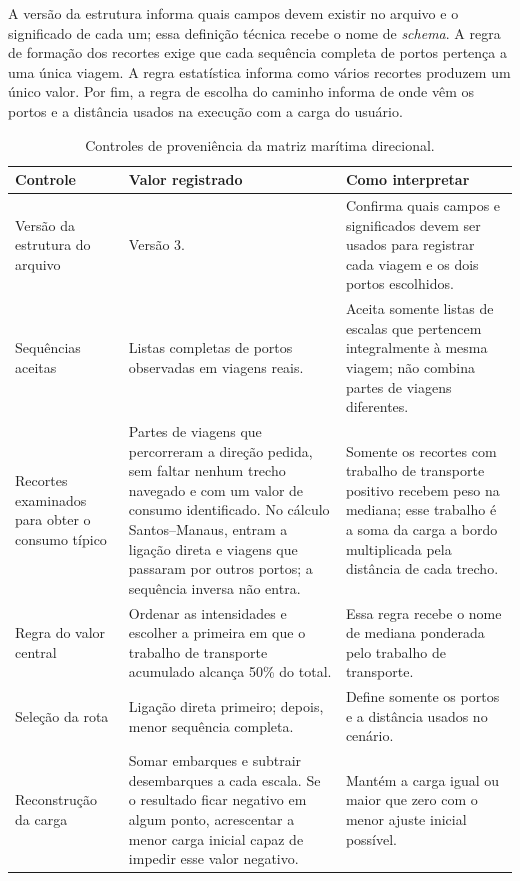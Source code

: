 A versão da estrutura informa quais campos devem existir no arquivo e o significado de cada um; essa definição técnica recebe o nome de \emph{schema}. A regra de formação dos recortes exige que cada sequência completa de portos pertença a uma única viagem. A regra estatística informa como vários recortes produzem um único valor. Por fim, a regra de escolha do caminho informa de onde vêm os portos e a distância usados na execução com a carga do usuário.

\begin{table}[htbp]
\centering
\footnotesize
\setlength{\tabcolsep}{4pt}
\renewcommand{\arraystretch}{1.15}
\caption{Controles de proveniência da matriz marítima direcional.}
\label{tab:app-controles-artefato}
\begin{tabularx}{\textwidth}{L{0.29\textwidth}L{0.27\textwidth}Y}
\toprule
Controle & Valor registrado & Como interpretar \\
\midrule
Versão da estrutura do arquivo & Versão 3. & Confirma quais campos e significados devem ser usados para registrar cada viagem e os dois portos escolhidos.\\
Sequências aceitas & Listas completas de portos observadas em viagens reais. & Aceita somente listas de escalas que pertencem integralmente à mesma viagem; não combina partes de viagens diferentes.\\
Recortes examinados para obter o consumo típico & Partes de viagens que percorreram a direção pedida, sem faltar nenhum trecho navegado e com um valor de consumo identificado. No cálculo Santos--Manaus, entram a ligação direta e viagens que passaram por outros portos; a sequência inversa não entra. & Somente os recortes com trabalho de transporte positivo recebem peso na mediana; esse trabalho é a soma da carga a bordo multiplicada pela distância de cada trecho.\\
Regra do valor central & Ordenar as intensidades e escolher a primeira em que o trabalho de transporte acumulado alcança 50\% do total. & Essa regra recebe o nome de mediana ponderada pelo trabalho de transporte.\\
Seleção da rota & Ligação direta primeiro; depois, menor sequência completa. & Define somente os portos e a distância usados no cenário.\\
Reconstrução da carga & Somar embarques e subtrair desembarques a cada escala. Se o resultado ficar negativo em algum ponto, acrescentar a menor carga inicial capaz de impedir esse valor negativo. & Mantém a carga igual ou maior que zero com o menor ajuste inicial possível.\\

\end{tabularx}
\end{table}
